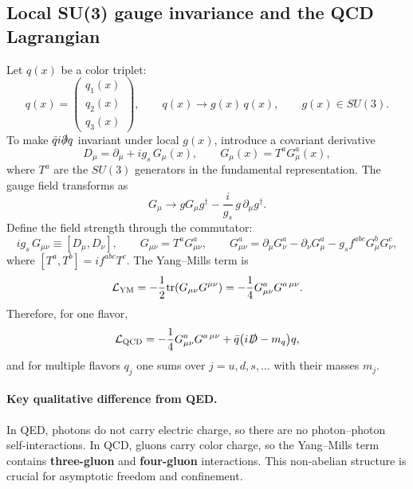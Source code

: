\subsection{Local SU(3) gauge invariance and the QCD Lagrangian}
Let $q(x)$ be a color triplet:
\[
q(x)=\begin{pmatrix}q_1(x)\\ q_2(x)\\ q_3(x)\end{pmatrix},
\qquad q(x)\to g(x)\,q(x),\qquad g(x)\in SU(3).
\]
To make $\bar q i\slashed{\partial} q$ invariant under local $g(x)$, introduce a covariant derivative
\begin{equation}
D_\mu = \partial_\mu + i g_s\, G_\mu(x),\qquad G_\mu(x)=T^a G^a_\mu(x),
\end{equation}
where $T^a$ are the $SU(3)$ generators in the fundamental representation.
The gauge field transforms as
\begin{equation}
G_\mu \to g G_\mu g^\dagger - \frac{i}{g_s}\,g\,\partial_\mu g^\dagger.
\end{equation}
Define the field strength through the commutator:
\begin{equation}
i g_s\,G_{\mu\nu} \equiv [D_\mu,D_\nu],
\qquad
G_{\mu\nu}=T^a G^a_{\mu\nu},
\qquad
G^a_{\mu\nu}=\partial_\mu G^a_\nu-\partial_\nu G^a_\mu - g_s f^{abc}G^b_\mu G^c_\nu,
\end{equation}
where $[T^a,T^b]=i f^{abc}T^c$. The Yang--Mills term is
\begin{equation}
\mathcal L_{\rm YM}= -\frac12 \mathrm{tr}(G_{\mu\nu}G^{\mu\nu})
= -\frac14 G^a_{\mu\nu}G^{a\,\mu\nu}.
\end{equation}
Therefore, for one flavor,
\begin{equation}
\mathcal L_{\rm QCD} = -\frac14 G^a_{\mu\nu}G^{a\,\mu\nu}
+\bar q\bigl(i\slashed{D}-m_q\bigr)q,
\end{equation}
and for multiple flavors $q_j$ one sums over $j=u,d,s,\dots$ with their masses $m_j$.

\paragraph{Key qualitative difference from QED.}
In QED, photons do not carry electric charge, so there are no photon--photon self-interactions.
In QCD, gluons carry color charge, so the Yang--Mills term contains \textbf{three-gluon}
and \textbf{four-gluon} interactions. This non-abelian structure is crucial for
asymptotic freedom and confinement.

